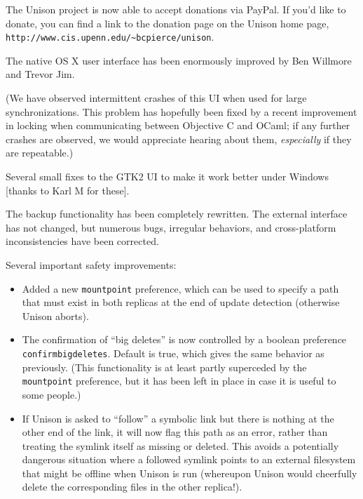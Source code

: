 \begin{changesfromversion}{2.17}
\item The Unison project is now able to accept donations via PayPal.  If
you'd like to donate, you can find a link to the donation page on the Unison
home page, \verb|http://www.cis.upenn.edu/~bcpierce/unison|.  

\item The native OS X user interface has been enormously improved by Ben
Willmore and Trevor Jim.  

(We have observed intermittent crashes of this UI when used for large
synchronizations.  This problem has hopefully been fixed by a recent
improvement in locking when communicating between Objective C and OCaml; if
any further crashes are observed, we would appreciate hearing about them,
{\em especially} if they are repeatable.)

\item Several small fixes to the GTK2 UI to make it work better under
Windows [thanks to Karl M for these].

\item The backup functionality has been completely rewritten.  The external
interface has not changed, but numerous bugs, irregular behaviors, and
cross-platform inconsistencies have been corrected.

\item Several important safety improvements:
\begin{itemize}
\item Added a new \verb|mountpoint| preference, which can be used to
  specify a path that must exist in both replicas at the end of update
  detection (otherwise Unison aborts).

\item The confirmation of ``big deletes'' is now controlled by a boolean preference
  \verb|confirmbigdeletes|.  Default is true, which gives the same behavior as
  previously.  (This functionality is at least partly superceded by the
  \verb|mountpoint| preference, but it has been left in place in case it is
  useful to some people.)
  
  \item If Unison is asked to ``follow'' a symbolic link but there is
  nothing at the other end of the link, it will now flag this path as an
  error, rather than treating the symlink itself as missing or deleted.
  This avoids a potentially dangerous situation where a followed symlink
  points to an external filesystem that might be offline when Unison is run
  (whereupon Unison would cheerfully delete the corresponding files in the
  other replica!).
  \end{itemize}


\end{changesfromversion}
